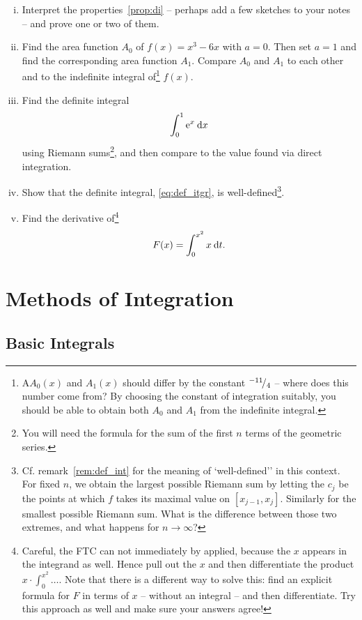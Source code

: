 \begin{exercise}
\begin{enumerate}[(i)]
	\item Interpret the properties~\ref{prop:di} -- perhaps add a few sketches to your notes -- and prove one or two of them.
	\item Find the area function $A_0$ of $f(x)=x^3-6x$ with $a=0$. Then set $a=1$ and find the corresponding area function $A_1$. Compare $A_0$ and $A_1$ to each other and to the indefinite integral of\footnote{A$A_0(x)$ and $A_1(x)$ should differ by the constant ${}^{-11}\!/_{4}$ -- where does this number come from? By choosing the constant of integration suitably, you should be able to obtain both $A_0$ and $A_1$ from the indefinite integral.} $f(x)$.
	\item Find the definite integral
	\[ \int_{0}^{1} \mathrm{e}^x \: \mathrm{d} x \]
	using Riemann sums\footnote{You will need the formula for the sum of the first $n$ terms of the geometric series.}, and then compare to the value found via direct integration.
	\item Show that the definite integral, \eqref{eq:def_itgr}, is well-defined\footnote{Cf. remark~\ref{rem:def_int} for the meaning of `well-defined'' in this context. For fixed $n$, we obtain the largest possible Riemann sum by letting the $c_j$ be the points at which $f$ takes its maximal value on $[x_{j-1},x_j]$. Similarly for the smallest possible Riemann sum. What is the difference between those two extremes, and what happens for $n\to\infty$?}.
	\item Find the derivative of\footnote{Careful, the FTC can not immediately by applied, because the $x$ appears in the integrand as well. Hence pull out the $x$ and then differentiate the product $x \cdot \int_0^{x^2}\dots$. Note that there is a different way to solve this: find an explicit formula for $F$ in terms of $x$ -- without an integral -- and then differentiate. Try this approach as well and make sure your answers agree!}
	\[ F(x) = \int_{0}^{x^2} x \: \mathrm{d} t. \]
\end{enumerate}
\end{exercise}


\section{Methods of Integration}

\subsection{Basic Integrals}


